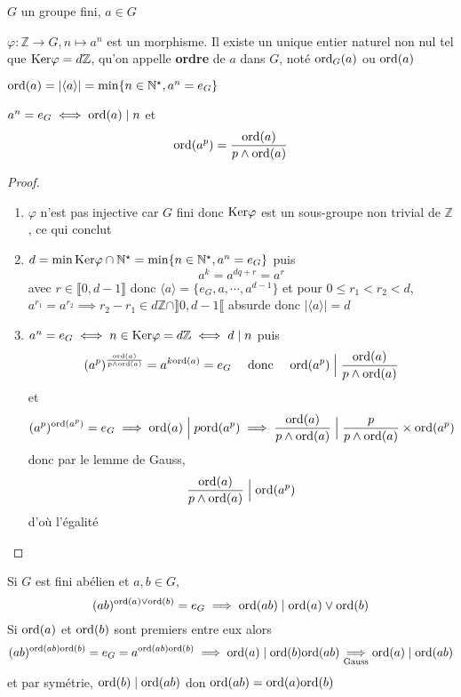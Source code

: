 \begin{defprop}
    \Hyp $G$ un groupe fini, $a\in G$
    \begin{concenum}
    \item $\varphi:\mathbb Z\longrightarrow G, n\longmapsto a^n$ est un morphisme. Il existe un unique entier naturel non nul tel que $\mathrm{Ker} \varphi=d\mathbb Z$, qu'on appelle \textbf{ordre} de $a$ dans $G$, noté $\mathrm{ord}_G (a)$ ou $\mathrm{ord} (a)$
    \item $\mathrm{ord} (a)=|\langle a\rangle|=\min\{n\in\mathbb N^\star, a^n=e_G\}$
    \item $a^n=e_G \iff \mathrm{ord}(a)\;|\; n$ et \[
            \mathrm{ord}(a^p)=\frac{\mathrm{ord} (a)}{p\land \mathrm{ord} (a)}
        \]
    \end{concenum}
\end{defprop}

\begin{proof}~
    \begin{enumerate}
        \item $\varphi$ n'est pas injective car $G$ fini donc $\mathrm{Ker} \varphi$ est un sous-groupe non trivial de $\mathbb Z$, ce qui conclut
        \item $d=\min \mathrm{Ker}\varphi\cap \mathbb N^\star=\min\{n\in\mathbb N^\star, a^n=e_G\}$ puis \[
                a^k=a^{dq+r}=a^r
            \] avec $r\in\llbracket 0, d-1\rrbracket$ donc $\langle a\rangle = \{e_G, a, \cdots, a^{d-1}\}$ et pour $0\leq r_1<r_2<d$, $a^{r_1}=a^{r_2} \implies r_2-r_1\in d\mathbb Z\cap \rrbracket 0, d-1 \llbracket $ absurde donc $|\langle a \rangle |=d$
        \item $a^n=e_G\iff n\in\mathrm{Ker} \varphi=d\mathbb Z\iff d\;|\;n$ puis \[
                \left( a^p \right)^{\frac{\mathrm{ord} (a)}{p\land \mathrm{ord}(a)}}=a^{k\mathrm{ord}(a)}=e_G\quad \text{ donc }\quad \mathrm{ord}(a^p)\;\Big|\;\frac{\mathrm{ord}(a)}{p\land\mathrm{ord}(a)}
            \]
            et \[
                (a^p)^{\mathrm{ord} (a^p)}=e_G \implies \mathrm{ord}(a)\;\Big|\;p\mathrm{ord} (a^p) \implies \frac{\mathrm{ord}(a)}{p\land \mathrm{ord}(a)}\;\Big|\; \frac{p}{p\land \mathrm{ord}(a)}\times \mathrm{ord}(a^p)
            \]
            donc par le lemme de Gauss, \[
                \frac{\mathrm{ord}(a)}{p\land \mathrm{ord}(a)}\;\Big|\; \mathrm{ord}(a^p)
            \]
            d'où l'égalité
    \end{enumerate}
\end{proof}

\begin{rem}
    Si $G$ est fini abélien et $a, b\in G$, \[
        (ab)^{\mathrm{ord}(a)\lor \mathrm{ord}(b)}=e_G\implies \mathrm{ord} (ab)\;|\; \mathrm{ord}(a)\lor \mathrm{ord}(b)
    \]
    Si $\mathrm{ord} (a)$ et $\mathrm{ord} (b)$ sont premiers entre eux alors \[
        (ab)^{\mathrm{ord}(ab)\mathrm{ord} (b)}=e_G=a^{\mathrm{ord}(ab)\mathrm{ord}(b)}\implies \mathrm{ord} (a)\;|\;\mathrm{ord} (b)\mathrm{ord}(ab)\underset{\text{Gauss}}\implies \mathrm{ord}(a)\;|\;\mathrm{ord}(ab)
    \]
    et par symétrie, $\mathrm{ord}(b)\;|\;\mathrm{ord} (ab)$ don $\mathrm{ord}(ab)=\mathrm{ord}(a)\mathrm{ord}(b)$
\end{rem}


